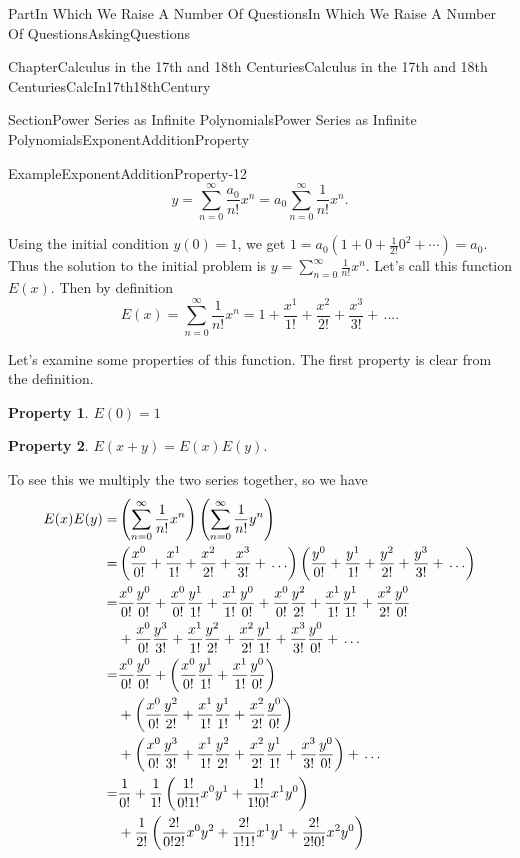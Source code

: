 \documentclass[oneside,10pt,]{book}
\newcommand{\terminology}[1]{\textbf{#1}}
\numberwithin{equation}{part}
\newcommand{\amp}{&}
\begin{document}
\begin{partptx}{Part}{In Which We Raise A Number Of Questions}{}{In Which We Raise A Number Of Questions}{}{}{AskingQuestions}
\begin{chapterptx}{Chapter}{Calculus in the 17th and 18th Centuries}{}{Calculus in the 17th and 18th Centuries}{}{}{CalcIn17th18thCentury}
\begin{sectionptx}{Section}{Power Series as Infinite Polynomials}{}{Power Series as Infinite Polynomials}{}{}{ExponentAdditionProperty}
\begin{example}{Example}{}{ExponentAdditionProperty-12}
\begin{equation*}
y=\sum_{n=0}^\infty\frac{a_0}{n!}x^n
=a_0\sum_{n=0}^\infty\frac{1}{n!}x^n \text{.}
\end{equation*}
%
\par
Using the initial condition \(y(0)=1\), we get \(1=a_0(1+0+\frac{1}{2!}0^2+\cdots)=a_0\).  Thus the solution to the initial problem is \(y=\sum_{n=0}^\infty\frac{1}{n!}x^n\).  Let's call this function \(E(x)\).  Then by definition%
\begin{equation*}
E(x)=\sum_{n=0}^\infty\frac{1}{n!}x^n=1+\frac{x^1}{1!}+\frac{x^2}{2!}+\frac{x^3}{3!}+\,\ldots\text{.}
\end{equation*}
%
\end{example}
Let's examine some properties of this function.  The first property is clear from the definition.%
\par
\terminology{Property 1}. \(E(0)=1\)%
\par
\terminology{Property 2}. \(E(x+y)=E(x)E(y)\).%
\par
To see this we multiply the two series together, so we have%
\begin{align}
E(x)E(y) =\amp \left(\sum_{n=0}^\infty\frac{1}{n!}x^n\right)\left(\sum_{n=0}^\infty\frac{1}{n!}y^n\right)\notag\\
=\amp \left(\frac{x^0}{0!}+\frac{x^1}{1!}+\frac{x^2}{2!}+\frac{x^3}{3!}+\,\ldots\right)\left(\frac{y^0}{0!}+\frac{y^1}{1!}+\frac{y^2}{2!}+\frac{y^3}{3!}+\,\ldots\right)\notag\\
=\amp \frac{x^0}{0!}\frac{y^0}{0!}+\frac{x^0}{0!}\frac{y^1}{1!}+\frac{x^1}{1!}\frac{y^0}{0!}+\frac{x^0}{0!}\frac{y^2}{2!}+\frac{x^1}{1!}\frac{y^1}{1!}+\frac{x^2}{2!}\frac{y^0}{0!}\notag\\
\amp        +\frac{x^0}{0!}\frac{y^3}{3!}+\frac{x^1}{1!}\frac{y^2}{2!}+\frac{x^2}{2!}\frac{y^1}{1!}+\frac{x^3}{3!}\frac{y^0}{0!}+\,\ldots\notag\\
=\amp\frac{x^0}{0!}\frac{y^0}{0!}+\left(\frac{x^0}{0!}\frac{y^1}{1!}+ \frac{x^1}{1!}\frac{y^0}{0!}\right)\notag\\
\amp        +\left(\frac{x^0}{0!}\frac{y^2}{2!}+\frac{x^1}{1!}\frac{y^1}{1!}+\frac{x^2}{2!}\frac{y^0}{0!}\right)\notag\\
\amp       +\left(\frac{x^0}{0!}\frac{y^3}{3!}+\frac{x^1}{1!}\frac{y^2}{2!}+\frac{x^2}{2!}\frac{y^1}{1!}+\frac{x^3}{3!}\frac{y^0}{0!}\right)+\,\ldots\notag\\
=\amp\frac{1}{0!}+\frac{1}{1!}\left(\frac{1!}{0!1!}x^0y^1+\frac{1!}{1!0!}x^1y^0\right)\notag\\
\amp       +\frac{1}{2!}\left(\frac{2!}{0!2!}x^0y^2+\frac{2!}{1!1!}x^1y^1+\frac{2!}{2!0!}x^2y^0\right)\notag\\

\end{align}
\end{sectionptx}
\end{chapterptx}
\end{partptx}
\end{document}
